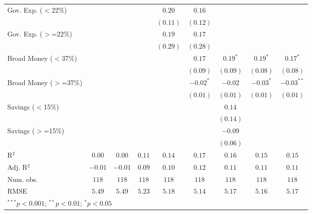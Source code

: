 \documentclass[
]{article}
\begin{document}
\begin{tabular}{l c c c c c c c c}
Gov. Exp. ($<$22\%)    &              &              &               & $0.20$       & $0.16$       &              &              &              \\
                       &              &              &               & $(0.11)$     & $(0.12)$     &              &              &              \\
Gov. Exp. ($>$=22\%)   &              &              &               & $0.19$       & $0.17$       &              &              &              \\
                       &              &              &               & $(0.29)$     & $(0.28)$     &              &              &              \\
Broad Money ($<$37\%)  &              &              &               &              & $0.17$       & $0.19^{*}$   & $0.19^{*}$   & $0.17^{*}$   \\
                       &              &              &               &              & $(0.09)$     & $(0.09)$     & $(0.08)$     & $(0.08)$     \\
Broad Money ($>$=37\%) &              &              &               &              & $-0.02^{*}$  & $-0.02$      & $-0.03^{*}$  & $-0.03^{**}$ \\
                       &              &              &               &              & $(0.01)$     & $(0.01)$     & $(0.01)$     & $(0.01)$     \\
Savings ($<$15\%)      &              &              &               &              &              & $0.14$       &              &              \\
                       &              &              &               &              &              & $(0.14)$     &              &              \\
Savings ($>$=15\%)     &              &              &               &              &              & $-0.09$      &              &              \\
                       &              &              &               &              &              & $(0.06)$     &              &              \\
\hline
R$^2$                  & $0.00$       & $0.00$       & $0.11$        & $0.14$       & $0.17$       & $0.16$       & $0.15$       & $0.15$       \\
Adj. R$^2$             & $-0.01$      & $-0.01$      & $0.09$        & $0.10$       & $0.12$       & $0.11$       & $0.11$       & $0.11$       \\
Num. obs.              & $118$        & $118$        & $118$         & $118$        & $118$        & $118$        & $118$        & $118$        \\
RMSE                   & $5.49$       & $5.49$       & $5.23$        & $5.18$       & $5.14$       & $5.17$       & $5.16$       & $5.17$       \\
\hline
\multicolumn{9}{l}{\scriptsize{$^{***}p<0.001$; $^{**}p<0.01$; $^{*}p<0.05$}}
\end{tabular}
\end{document}
